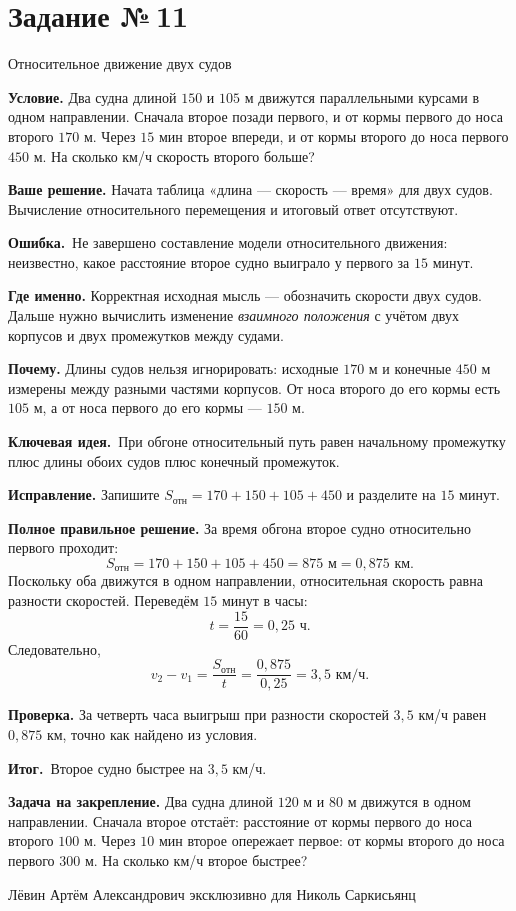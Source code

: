 \documentclass[a4paper,11pt]{article}
\newcommand{\Hdr}[1]{\par\vspace{2pt}\noindent\textbf{#1}\quad}
\newcommand{\E}{\par\smallskip\noindent\textcolor{errorred}{\textbf{Ошибка.}}\ }
\newcommand{\K}{\par\smallskip\noindent\textcolor{accent}{\textbf{Ключевая идея.}}\ }
\newcommand{\I}{\par\smallskip\noindent\textcolor{accent}{\textbf{Итог.}}\ }
\newcommand{\Task}[2]{\clearpage\phantomsection\label{task:#1}\section*{Задание №\,#1}\textcolor{accent}{#2}\par\vspace{7pt}}
\newcommand{\Footer}{\par\vfill\begin{center}\footnotesize\color{ink}Лёвин Артём Александрович эксклюзивно для Николь Саркисьянц\end{center}}
\begin{document}
\Task{11}{Относительное движение двух судов}
\Hdr{Условие.} Два судна длиной $150$ и $105$ м движутся параллельными курсами в одном направлении. Сначала второе позади первого, и от кормы первого до носа второго $170$ м. Через $15$ мин второе впереди, и от кормы второго до носа первого $450$ м. На сколько км/ч скорость второго больше?
\Hdr{Ваше решение.} Начата таблица «длина --- скорость --- время» для двух судов. Вычисление относительного перемещения и итоговый ответ отсутствуют.
\E Не завершено составление модели относительного движения: неизвестно, какое расстояние второе судно выиграло у первого за $15$ минут.
\Hdr{Где именно.} Корректная исходная мысль --- обозначить скорости двух судов. Дальше нужно вычислить изменение \emph{взаимного положения} с учётом двух корпусов и двух промежутков между судами.
\Hdr{Почему.} Длины судов нельзя игнорировать: исходные $170$ м и конечные $450$ м измерены между разными частями корпусов. От носа второго до его кормы есть $105$ м, а от носа первого до его кормы --- $150$ м.
\K При обгоне относительный путь равен начальному промежутку плюс длины обоих судов плюс конечный промежуток.
\Hdr{Исправление.} Запишите $S_{\text{отн}}=170+150+105+450$ и разделите на $15$ минут.
\Hdr{Полное правильное решение.} За время обгона второе судно относительно первого проходит:
\[
S_{\text{отн}}=170+150+105+450=875\text{ м}=0{,}875\text{ км}.
\]
Поскольку оба движутся в одном направлении, относительная скорость равна разности скоростей. Переведём $15$ минут в часы:
\[
t=\frac{15}{60}=0{,}25\text{ ч}.
\]
Следовательно,
\[
v_2-v_1=\frac{S_{\text{отн}}}{t}=\frac{0{,}875}{0{,}25}=\boxed{3{,}5\text{ км/ч}}.
\]
\Hdr{Проверка.} За четверть часа выигрыш при разности скоростей $3{,}5$ км/ч равен $0{,}875$ км, точно как найдено из условия.
\I Второе судно быстрее на $3{,}5$ км/ч.
\Hdr{Задача на закрепление.} Два судна длиной $120$ м и $80$ м движутся в одном направлении. Сначала второе отстаёт: расстояние от кормы первого до носа второго $100$ м. Через $10$ мин второе опережает первое: от кормы второго до носа первого $300$ м. На сколько км/ч второе быстрее?
\Footer
\end{document}

